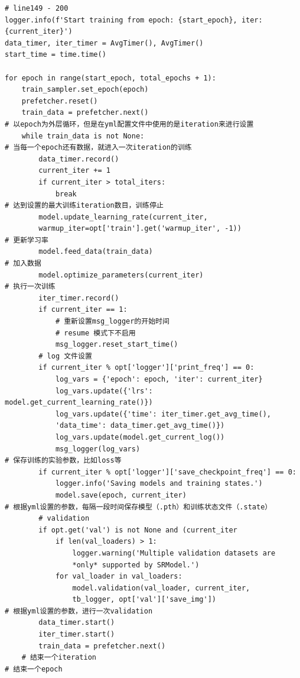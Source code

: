\documentclass[../main.tex]{subfiles}
\begin{document}
\begin{enumerate}
\begin{enumerate}
\begin{verbatim}
# line149 - 200
logger.info(f'Start training from epoch: {start_epoch}, iter: {current_iter}')
data_timer, iter_timer = AvgTimer(), AvgTimer()
start_time = time.time()

for epoch in range(start_epoch, total_epochs + 1):
    train_sampler.set_epoch(epoch)
    prefetcher.reset()
    train_data = prefetcher.next()
# 以epoch为外层循环，但是在yml配置文件中使用的是iteration来进行设置
    while train_data is not None:
# 当每一个epoch还有数据，就进入一次iteration的训练
        data_timer.record()
        current_iter += 1
        if current_iter > total_iters:
            break
# 达到设置的最大训练iteration数目，训练停止
        model.update_learning_rate(current_iter,
        warmup_iter=opt['train'].get('warmup_iter', -1))
# 更新学习率
        model.feed_data(train_data)
# 加入数据
        model.optimize_parameters(current_iter)
# 执行一次训练
        iter_timer.record()
        if current_iter == 1:
            # 重新设置msg_logger的开始时间
            # resume 模式下不启用
            msg_logger.reset_start_time()
        # log 文件设置
        if current_iter % opt['logger']['print_freq'] == 0:
            log_vars = {'epoch': epoch, 'iter': current_iter}
            log_vars.update({'lrs': model.get_current_learning_rate()})
            log_vars.update({'time': iter_timer.get_avg_time(),
            'data_time': data_timer.get_avg_time()})
            log_vars.update(model.get_current_log())
            msg_logger(log_vars)
# 保存训练的实验参数，比如loss等
        if current_iter % opt['logger']['save_checkpoint_freq'] == 0:
            logger.info('Saving models and training states.')
            model.save(epoch, current_iter)
# 根据yml设置的参数，每隔一段时间保存模型（.pth）和训练状态文件（.state）
        # validation
        if opt.get('val') is not None and (current_iter
            if len(val_loaders) > 1:
                logger.warning('Multiple validation datasets are
                *only* supported by SRModel.')
            for val_loader in val_loaders:
                model.validation(val_loader, current_iter,
                tb_logger, opt['val']['save_img'])
# 根据yml设置的参数，进行一次validation
        data_timer.start()
        iter_timer.start()
        train_data = prefetcher.next()
    # 结束一个iteration
# 结束一个epoch
\end{verbatim}

\end{enumerate}



\end{enumerate}
\end{document}
